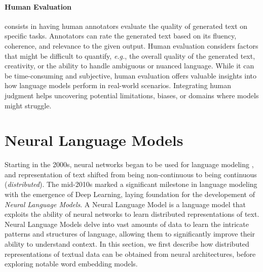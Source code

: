 \paragraph{Human Evaluation} consists in having human annotators evaluate the quality of generated text on specific tasks. Annotators can rate the generated text based on its fluency, coherence, and relevance to the given output. Human evaluation considers factors that might be difficult to quantify, \textit{e.g.}, the overall quality of the generated text, creativity, or the ability to handle ambiguous or nuanced language. While it can be time-consuming and subjective, human evaluation offers valuable insights into how language models perform in real-world scenarios. Integrating human judgment helps uncovering potential limitations, biases, or domains where models might struggle. 


\section{Neural Language Models}

Starting in the 2000s, neural networks began to be used for language modeling \citep{bengio2000neural}, and representation of text shifted from being non-continuous to being continuous (\textit{distributed}). The mid-2010s marked a significant milestone in language modeling with the emergence of Deep Learning, laying foundation for the developement of \textit{Neural Language Models}. A Neural Language Model is a language model that exploits the ability of neural networks to learn distributed representations of text. Neural Language Models delve into vast amounts of data to learn the intricate patterns and structures of language, allowing them to significantly improve their ability to understand context. In this section, we first describe how distributed representations of textual data can be obtained from neural architectures, before exploring notable word embedding models.


